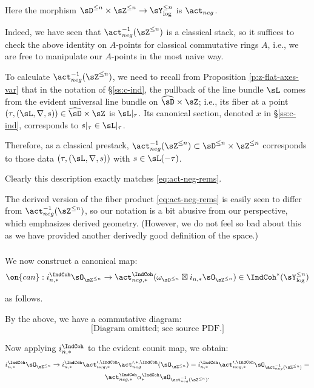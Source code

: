  Here the morphism
$\sD^{\leq n} \times \sZ^{\leq n} \to \sY_{\log}^{\leq n}$
is $\act_{neg}$.

Indeed, we have seen that
$\act_{neg}^{-1}(\sZ^{\leq n})$
is a classical stack, so it suffices to check
the above identity on $A$-points for classical
commutative rings $A$, i.e., we are free to
manipulate our $A$-points in the most naive way.

To calculate $\act_{neg}^{-1}(\sZ^{\leq n})$,
we need to recall from
Proposition \ref{p:z-flat-axes-var} that
in the notation of \S \ref{ss:c-ind}, the
pullback of the line bundle $\sL$ comes from
the evident universal line bundle
on $\widehat{\sD} \times \sZ$; i.e.,
its fiber at a point
$(\tau,(\sL,\nabla,s)) \in \widehat{\sD} \times \sZ$
is $\sL|_{\tau}$. Its canonical section,
denoted $x$ in \S \ref{ss:c-ind}, corresponds
to $s|_{\tau} \in \sL|_{\tau}$.

Therefore, as a classical prestack,
$\act_{neg}^{-1}(\sZ^{\leq n}) \subset
\sD^{\leq n} \times \sZ^{\leq n}$
corresponds to those data
$(\tau,(\sL,\nabla,s))$ with $s \in \sL(-\tau)$.

Clearly this description exactly matches
\eqref{eq:act-neg-rems}.

\begin{rem}
\notready

The derived version of the
fiber product \eqref{eq:act-neg-rems} is easily
seen to differ from
$\act_{neg}^{-1}(\sZ^{\leq n})$, so our notation
is a bit abusive from our perspective, which
emphasizes derived geometry. (However, we do
not feel so bad about this as we have provided
another derivedly good definition of the space.)

\end{rem}

\subsubsection{}\label{ss:can-constr}

We now construct a canonical map:
%
\[
\on{can}:
i_{n,*}^{\IndCoh}\sO_{\sZ^{\leq n}} \to
\act_{neg,*}^{\IndCoh}
(\omega_{\sD^{\leq n}} \boxtimes
i_{n,*}\sO_{\sZ^{\leq n}}) \in
\IndCoh^*(\sY_{\log}^{\leq n})
\]

 as follows.

By the above, we have a commutative diagram:
%
\[
\text{[Diagram omitted; see source PDF.]}
\]

Now applying $i_{n,*}^{\IndCoh}$
to the evident counit map, we obtain:
%
\[
\begin{gathered}
i_{n,*}^{\IndCoh}\sO_{\sZ^{\leq n}} \to
i_{n,*}^{\IndCoh} \act_{neg,*}^{\prime,\IndCoh}
\act_{neg}^{\prime,*,\IndCoh}(\sO_{\sZ^{\leq n}}) =
i_{n,*}^{\IndCoh} \act_{neg,*}^{\prime,\IndCoh}
\sO_{\act_{neg}^{-1}(\sZ^{\leq n})} = \\
\act_{neg,*}^{\IndCoh} \alpha_*^{\IndCoh}
\sO_{\act_{neg}^{-1}(\sZ^{\leq n})}.
\end{gathered}
\]

